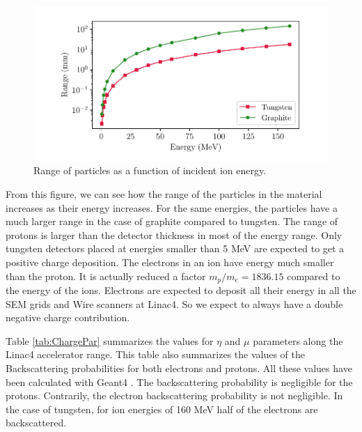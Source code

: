 \begin{figure}[h]
    \centering
    \includegraphics[width=1.0\columnwidth]{RangePlotLinac4/RangeL4.pdf}
    \caption{Range of particles as a function of incident ion energy.}
    \label{fig:RangeLinac4}
\end{figure}

From this figure, we can see how the range of the particles in the material increases as their energy increases. For the same energies, the particles have a much larger range in the case of graphite compared to tungsten. The range of protons is larger than the detector thickness in most of the energy range. Only tungsten detectors placed at energies smaller than 5  \si[]{\mega\electronvolt} are expected to get a positive charge deposition. The electrons in an \hm ion have energy much smaller than the proton. It is actually reduced a factor $m_p / m_e = 1836.15$ compared to the energy of the \hm ions.  Electrons are expected to deposit all their energy in all the SEM grids and Wire scanners at Linac4. So we expect to always have a double negative charge contribution. 

Table \ref{tab:ChargePar} summarizes the values for $\eta$ and $\mu$ parameters along the Linac4 accelerator range. This table also summarizes the values of the Backscattering probabilities for both electrons and protons. All these values have been calculated with Geant4 \parencite[][]{ref:Geant4}. The backscattering probability is negligible for the protons. Contrarily, the electron backscattering probability is not negligible. In the case of tungsten, for ion energies of 160 MeV half of the electrons are backscattered.

